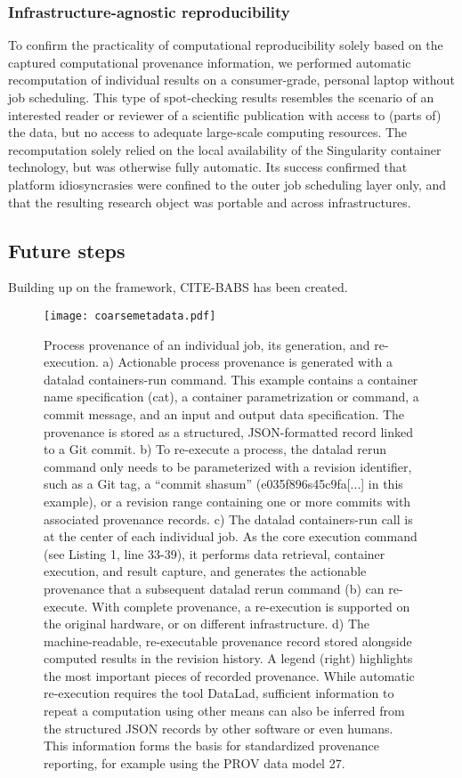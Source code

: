 \subsubsection{Infrastructure-agnostic reproducibility}

To confirm the practicality of computational reproducibility solely based on the captured computational provenance information, we performed automatic recomputation of individual results on a consumer-grade, personal laptop without job scheduling.
This type of spot-checking results resembles the scenario of an interested reader or reviewer of a scientific publication with access to (parts of) the data, but no access to adequate large-scale computing resources.
The recomputation solely relied on the local availability of the Singularity container technology, but was otherwise fully automatic.
Its success confirmed that platform idiosyncrasies were confined to the outer job scheduling layer only, and that the resulting research object was portable and across infrastructures.


\subsection{Future steps}


Building up on the framework, CITE-BABS has been created.


\begin{figure}
	\centering
	\texttt{[image: coarsemetadata.pdf]}
	\caption[Process provenance of an individual job]{Process provenance of an individual job, its generation, and re-execution. a) Actionable process provenance is generated with a datalad containers-run command. This example contains a container name specification (cat), a container parametrization or command, a commit message, and an input and output data specification. The provenance is stored as a structured, JSON-formatted record linked to a Git commit. b) To re-execute a process, the datalad rerun command only needs to be parameterized with a revision identifier, such as a Git tag, a “commit shasum” (e035f896s45c9fa[...] in this example), or a revision range containing one or more commits with associated provenance records. c) The datalad containers-run call is at the center of each individual job. As the core execution command (see Listing 1, line 33-39), it performs data retrieval, container execution, and result capture, and generates the actionable provenance that a subsequent datalad rerun command (b) can re-execute. With complete provenance, a re-execution is supported on the original hardware, or on different infrastructure. d) The machine-readable, re-executable provenance record stored alongside computed results in the revision history. A legend (right) highlights the most important pieces of recorded provenance. While automatic re-execution requires the tool DataLad, sufficient information to repeat a computation using other means can also be inferred from the structured JSON records by other software or even humans. This information forms the basis for standardized provenance reporting, for example using the PROV data model 27.}
	\label{fig:fairly_metadata}
\end{figure}

